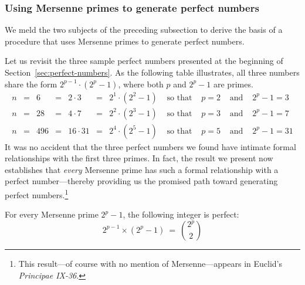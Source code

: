\subsubsection{Using Mersenne primes to generate perfect numbers}
\label{sec:MP+PN}

We meld the two subjects of the preceding subsection to derive the basis of a procedure that uses Mersenne primes to generate perfect numbers.

\medskip

Let us revisit the three sample perfect numbers presented at the beginning of Section~\ref{sec:perfect-numbers}.  As the following table illustrates, all three numbers share the form $2^{p-1} \cdot (2^p -1)$, where both $p$ and $2^p-1$ are primes.
\[ \begin{array}{ccccccccccc}
n & = & 6   & = & 2 \cdot 3  & = & 2^1 \cdot (2^2 -1) & 
\mbox{ so that } & p = 2 & 
\mbox{ and } & 2^p-1 = 3 \\
n & = & 28  & = & 4 \cdot 7  & = & 2^2 \cdot (2^3 -1) & 
\mbox{ so that } & p = 3 &
\mbox{ and } & 2^p-1 = 7 \\
n & = & 496 & = & 16 \cdot 31 & = & 2^4 \cdot (2^5 -1) & 
\mbox{ so that } & p=5 &
\mbox{ and } & 2^p-1 = 31
\end{array}
\]
It was no accident that the three perfect numbers we found have intimate formal relationships with the first three primes.  In fact, the result we present now establishes that {\em every} Mersenne prime has such a formal relationship with a perfect number---thereby providing us the promised path toward generating perfect numbers.\footnote{This result---of course with no mention of Mersenne---appears in Euclid's \textit{Principae IX-36}.} 

\begin{prop}
\label{thm:MP-PN}
For every Mersenne prime $2^p-1$, the following integer is perfect:
\begin{equation}
\label{eq:Mersenne-perfect-p}
2^{p-1} \times (2^p-1) \ = \ {{2^p} \choose 2}
\end{equation} 
\end{prop}

